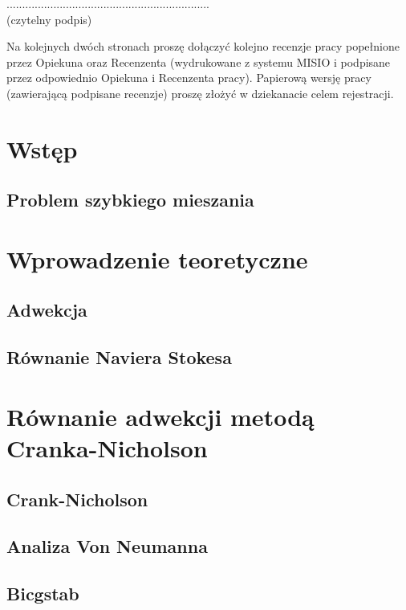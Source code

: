 \documentclass[a4paper,12pt]{book}
\begin{document}
\begin{flushright}
................................................................. \\
{\sf (czytelny podpis)}
\end{flushright}

\newpage
\linespread{1.3}
\selectfont

\noindent
Na kolejnych dwóch stronach proszę dołączyć kolejno recenzje pracy popełnione przez Opiekuna oraz Recenzenta
(wydrukowane z systemu MISIO i podpisane przez odpowiednio Opiekuna i Recenzenta pracy).
Papierową wersję pracy (zawierającą podpisane recenzje) proszę złożyć w dziekanacie celem rejestracji.

\vspace{85mm}

\newpage
\tableofcontents
\chapter{Wstęp}
\section{Problem szybkiego mieszania}
\chapter{Wprowadzenie teoretyczne}
\section{Adwekcja}
\section{Równanie Naviera Stokesa}
\chapter{Równanie adwekcji metodą Cranka-Nicholson}
\section{Crank-Nicholson}
\section{Analiza Von Neumanna}
\section{Bicgstab}
\end{document}
